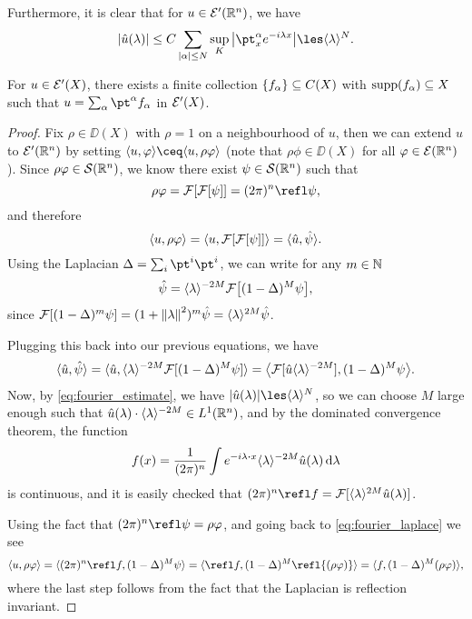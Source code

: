 Furthermore, it is clear that for $u \in \mathcal E'(\mathbb R^n)$, we have 
\begin{equation} \label{eq:fourier_estimate}
	\abs{\hat u(\lambda)} \leq C \sum_{\abs{\alpha} \leq N} \sup_K \abs{\pt^\alpha_x e^{-i\lambda x}} \les \ang{\lambda}^N.
\end{equation}

\begin{theorem}
	For $u \in \mathcal E'(X)$, there exists a finite collection $\qty{f_\alpha} \subseteq C(X)$ with $\operatorname{supp}(f_\alpha) \subseteq X$ such that $u = \sum_\alpha \pt^\alpha f_\alpha$ in $\mathcal E'(X)$. 
\end{theorem}

\begin{proof}
	Fix $\rho \in \DD(X)$ with $\rho = 1$ on a neighbourhood of $u$, then we can extend $u$ to $\mathcal E'(\mathbb R^n)$ by setting $\ang{u, \phi} \ceq \ang{u, \rho\phi}$ (note that $\rho\phi \in \DD(X)$ for all $\varphi \in \mathcal E(\mathbb R^n)$). Since $\rho\varphi \in \mathcal S(\mathbb R^n)$, we know there exist $\psi \in \mathcal S(\mathbb R^n)$ such that
	\[
	\rho\phi = \FF[\FF[\psi]] = (2\pi)^n \refl\psi, 
	\]
	and therefore
	\[
	\langle u, \rho\varphi\rangle = \langle u, \mathcal F[\mathcal F[\psi]]\rangle = \langle\hat u, \hat\psi\rangle. 
	\]
	Using the Laplacian $\Delta = \sum_i \pt^i \pt^i$, we can write for any $m \in \mathbb N$
	\[
	\hat\psi = \langle\lambda\rangle^{-2M} \mathcal F\qty[(1 - \Delta)^M \psi],
	\]
	since $\mathcal F\qty[(1 - \Delta)^m \psi] = (1 + \norm{\lambda}^2)^m \hat\psi = \langle\lambda\rangle^{2M}\hat\psi$. 
	
	Plugging this back into our previous equations, we have
	\begin{equation} \label{eq:fourier_laplace}
		\ang{\hat u, \hat\psi} = \ang{\hat u, \ang{\lambda}^{-2M} \FF[(1 - \Delta)^M \psi]} = \ang*{\FF[\hat u \ang{\lambda}^{-2M}], (1 - \Delta)^M \psi}.
	\end{equation}
Now, by \cref{eq:fourier_estimate}, we have $\abs{\hat u(\lambda)} \les \ang{\lambda}^N$, so we can choose $M$ large enough such that $\hat u(\lambda) \cdot \langle\lambda\rangle^{-2M} \in L^1(\mathbb R^n)$, and by the dominated convergence theorem, the function
\[
f(x) = \frac1{(2\pi)^n} \int e^{-i\lambda \vdot x} \ang{\lambda}^{-2M} \hat u(\lambda) \dd{\lambda} 
\]
is continuous, and it is easily checked that $(2\pi)^n \refl f = \FF[\ang{\lambda}^{2M} \hat u(\lambda)]$. 

Using the fact that $(2\pi)^n \refl\psi = \rho\phi$, and going back to \cref{eq:fourier_laplace} we see
\[
\ang{u, \rho\phi} = \ang{(2\pi)^n \refl f, (1 - \Delta)^M \psi} = \ang{\refl f, (1 -\Delta)^M \refl{(\rho\phi)}} = \ang{f, (1 - \Delta)^M (\rho\phi)}, 
\]
where the last step follows from the fact that the Laplacian is reflection invariant. 


\end{proof}
